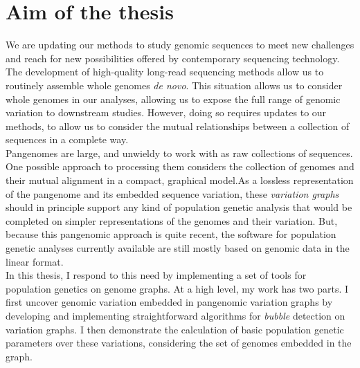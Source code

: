 
\chapter{Aim of the thesis} %

\label{Chapter4} %



We are updating our methods to study genomic sequences to meet new challenges and reach for new possibilities offered by contemporary sequencing technology. The development of high-quality long-read sequencing methods allow us to routinely assemble whole genomes \emph{de novo}. This situation allows us to consider whole genomes in our analyses, allowing us to expose the full range of genomic variation to downstream studies. However, doing so requires updates to our methods, to allow us to consider the mutual relationships between a collection of sequences in a complete way.\\

Pangenomes are large, and unwieldy to work with as raw collections of sequences. One possible approach to processing them considers the collection of genomes and their mutual alignment in a compact, graphical model.As a lossless representation of the pangenome and its embedded sequence variation, these \emph{variation graphs} should in principle support any kind of population genetic analysis that would be completed on simpler representations of the genomes and their variation. But, because this pangenomic approach is quite recent, the software for population genetic analyses currently available are still mostly based on genomic data in the linear format.\\

In this thesis, I respond to this need by implementing a set of tools for population genetics on genome graphs. At a high level, my work has two parts. I first uncover genomic variation embedded in pangenomic variation graphs by developing and implementing straightforward algorithms for \emph{bubble} detection on variation graphs. I then demonstrate the calculation of basic population genetic parameters over these variations, considering the set of genomes embedded in the graph.\\

